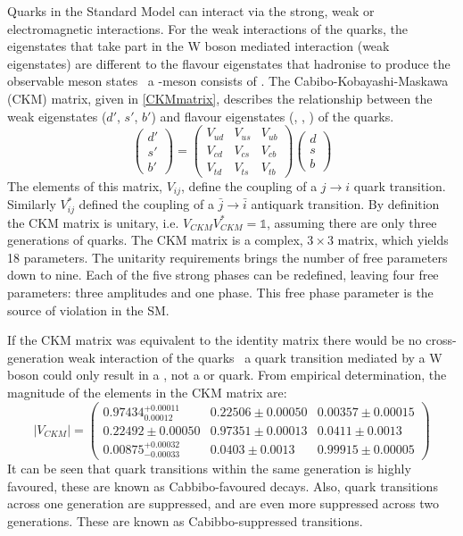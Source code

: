 Quarks in the Standard Model can interact via the strong, weak or electromagnetic interactions. For the weak interactions of the quarks, the eigenstates that take part in the W boson mediated interaction (weak eigenstates) are different to the flavour eigenstates that hadronise to produce the observable meson states \eg\ a \Bm-meson consists of \uquarkbar\bquark. The Cabibo-Kobayashi-Maskawa (CKM) matrix, given in \eqn \ref{CKMmatrix}, describes the relationship between the weak eigenstates ($d'$, $s'$, $b'$) and flavour eigenstates (\dquark, \squark, \bquark) of the quarks. 
\begin{equation}
\left(
\begin{array}{c} d' \\ s' \\ b'  \end{array} \right) =
\begin{pmatrix} V_{ud} & V_{us} & V_{ub} \\ V_{cd} & V_{cs} & V_{cb} \\ V_{td} & V_{ts} & V_{tb} \end{pmatrix} \left( 
\begin{array}{c} d \\ s \\ b \end{array} \right)
\label{CKMmatrix}
\end{equation}
The elements of this matrix, $V_{ij}$, define the coupling of a $j \to i$ quark transition. Similarly $V_{ij}^*$ defined the coupling of a $\bar{j} \to \bar{i}$ antiquark transition. By definition the CKM matrix is unitary, i.e. $V_{CKM}V_{CKM}^* = \mathds{1}$, assuming there are only three generations of quarks. The CKM matrix is a complex, $3 \times 3$ matrix, which yields 18 parameters. The unitarity requirements brings the number of free parameters down to nine. Each of the five strong phases can be redefined, leaving four free parameters: three amplitudes and one phase. This free phase parameter is the source of \CP violation in the SM.

If the CKM matrix was equivalent to the identity matrix there would be no cross-generation weak interaction of the quarks \eg\ a \uquark quark transition mediated by a W boson could only result in a \dquark, not a \squark or \bquark quark. From empirical determination, the magnitude of the elements in the CKM matrix are:
\begin{equation}
| V_{CKM} | = \begin{pmatrix} 0.97434^{+0.00011}_{0.00012} & 0.22506 \pm 0.00050 & 0.00357 \pm 0.00015 \\ 0.22492 \pm 0.00050 & 0.97351 \pm 0.00013 & 0.0411 \pm 0.0013 \\ 0.00875^{+0.00032}_{-0.00033} & 0.0403 \pm 0.0013 & 0.99915 \pm 0.00005 \end{pmatrix}
\end{equation}
It can be seen that quark transitions within the same generation is highly favoured, these are known as Cabbibo-favoured decays. Also, quark transitions across one generation are suppressed, and are even more suppressed across two generations. These are known as Cabibbo-suppressed transitions.

